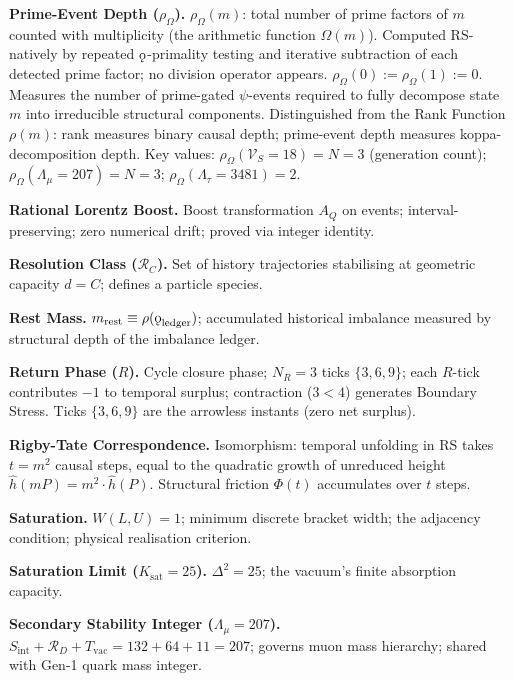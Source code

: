 \documentclass[11pt, letterpaper]{article}
\newcommand{\rank}{\rho}
\newcommand{\koppa}{\mathbin{\text{\rm\k{o}}}}
\newcommand{\Sint}{S_{\mathrm{int}}}
\theoremstyle{definition}
\theoremstyle{plain}
\begin{document}
\medskip\noindent\textbf{Prime-Event Depth ($\rho_\Omega$).}
$\rho_\Omega(m)$: total number of prime factors of $m$ counted with
multiplicity (the arithmetic function $\Omega(m)$).  Computed RS-natively
by repeated $\koppa$-primality testing and iterative subtraction of each
detected prime factor; no division operator appears.  $\rho_\Omega(0) :=
\rho_\Omega(1) := 0$.  Measures the number of prime-gated $\psi$-events
required to fully decompose state $m$ into irreducible structural
components.  Distinguished from the Rank Function $\rank(m)$: rank measures
binary causal depth; prime-event depth measures koppa-decomposition depth.
Key values: $\rho_\Omega(\mathcal{V}_S\!=\!18)=N=3$ (generation count);
$\rho_\Omega(\Lambda_\mu\!=\!207)=N=3$; $\rho_\Omega(\Lambda_\tau\!=\!3481)=2$.

\medskip\noindent\textbf{Rational Lorentz Boost.}
Boost transformation $A_Q$ on events; interval-preserving; zero numerical
drift; proved via integer identity.

\medskip\noindent\textbf{Resolution Class ($\mathcal{R}_C$).}
Set of history trajectories stabilising at geometric capacity $d=C$; defines
a particle species.

\medskip\noindent\textbf{Rest Mass.}
$m_{\mathrm{rest}}\equiv\rank(\koppa_{\mathrm{ledger}})$; accumulated
historical imbalance measured by structural depth of the imbalance ledger.

\medskip\noindent\textbf{Return Phase ($R$).}
Cycle closure phase; $N_R=3$ ticks $\{3,6,9\}$; each $R$-tick contributes
$-1$ to temporal surplus; contraction ($3<4$) generates Boundary Stress.
Ticks $\{3,6,9\}$ are the arrowless instants (zero net surplus).

\medskip\noindent\textbf{Rigby-Tate Correspondence.}
Isomorphism: temporal unfolding in RS takes $t = m^2$ causal steps,
equal to the quadratic growth of unreduced height $\hat{h}(mP) = m^2 \cdot \hat{h}(P)$.
Structural friction $\Phi(t)$ accumulates over $t$ steps.

\medskip\noindent\textbf{Saturation.}
$W(L,U)=1$; minimum discrete bracket width; the adjacency condition;
physical realisation criterion.

\medskip\noindent\textbf{Saturation Limit ($K_{\mathrm{sat}}=25$).}
$\Delta^2=25$; the vacuum's finite absorption capacity.

\medskip\noindent\textbf{Secondary Stability Integer ($\Lambda_\mu=207$).}
$\Sint+\mathcal{R}_D+T_{\mathrm{vac}}=132+64+11=207$; governs muon mass
hierarchy; shared with Gen-1 quark mass integer.
\end{document}
